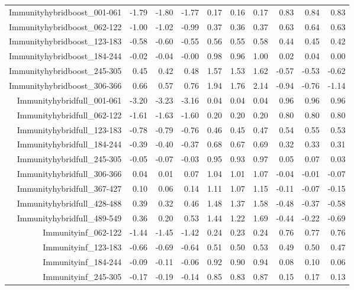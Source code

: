 \begin{table}[ht]
\begin{tabular}{rrrrrrrrrr}
  Immunityhybridboost\_001-061 & -1.79 & -1.80 & -1.77 & 0.17 & 0.16 & 0.17 & 0.83 & 0.84 & 0.83 \\ 
  Immunityhybridboost\_062-122 & -1.00 & -1.02 & -0.99 & 0.37 & 0.36 & 0.37 & 0.63 & 0.64 & 0.63 \\ 
  Immunityhybridboost\_123-183 & -0.58 & -0.60 & -0.55 & 0.56 & 0.55 & 0.58 & 0.44 & 0.45 & 0.42 \\ 
  Immunityhybridboost\_184-244 & -0.02 & -0.04 & -0.00 & 0.98 & 0.96 & 1.00 & 0.02 & 0.04 & 0.00 \\ 
  Immunityhybridboost\_245-305 & 0.45 & 0.42 & 0.48 & 1.57 & 1.53 & 1.62 & -0.57 & -0.53 & -0.62 \\ 
  Immunityhybridboost\_306-366 & 0.66 & 0.57 & 0.76 & 1.94 & 1.76 & 2.14 & -0.94 & -0.76 & -1.14 \\ 
  Immunityhybridfull\_001-061 & -3.20 & -3.23 & -3.16 & 0.04 & 0.04 & 0.04 & 0.96 & 0.96 & 0.96 \\ 
  Immunityhybridfull\_062-122 & -1.61 & -1.63 & -1.60 & 0.20 & 0.20 & 0.20 & 0.80 & 0.80 & 0.80 \\ 
  Immunityhybridfull\_123-183 & -0.78 & -0.79 & -0.76 & 0.46 & 0.45 & 0.47 & 0.54 & 0.55 & 0.53 \\ 
  Immunityhybridfull\_184-244 & -0.39 & -0.40 & -0.37 & 0.68 & 0.67 & 0.69 & 0.32 & 0.33 & 0.31 \\ 
  Immunityhybridfull\_245-305 & -0.05 & -0.07 & -0.03 & 0.95 & 0.93 & 0.97 & 0.05 & 0.07 & 0.03 \\ 
  Immunityhybridfull\_306-366 & 0.04 & 0.01 & 0.07 & 1.04 & 1.01 & 1.07 & -0.04 & -0.01 & -0.07 \\ 
  Immunityhybridfull\_367-427 & 0.10 & 0.06 & 0.14 & 1.11 & 1.07 & 1.15 & -0.11 & -0.07 & -0.15 \\ 
  Immunityhybridfull\_428-488 & 0.39 & 0.32 & 0.46 & 1.48 & 1.37 & 1.58 & -0.48 & -0.37 & -0.58 \\ 
  Immunityhybridfull\_489-549 & 0.36 & 0.20 & 0.53 & 1.44 & 1.22 & 1.69 & -0.44 & -0.22 & -0.69 \\ 
  Immunityinf\_062-122 & -1.44 & -1.45 & -1.42 & 0.24 & 0.23 & 0.24 & 0.76 & 0.77 & 0.76 \\ 
  Immunityinf\_123-183 & -0.66 & -0.69 & -0.64 & 0.51 & 0.50 & 0.53 & 0.49 & 0.50 & 0.47 \\ 
  Immunityinf\_184-244 & -0.09 & -0.11 & -0.06 & 0.92 & 0.90 & 0.94 & 0.08 & 0.10 & 0.06 \\ 
  Immunityinf\_245-305 & -0.17 & -0.19 & -0.14 & 0.85 & 0.83 & 0.87 & 0.15 & 0.17 & 0.13 \\ 

\end{tabular}
\end{table}

